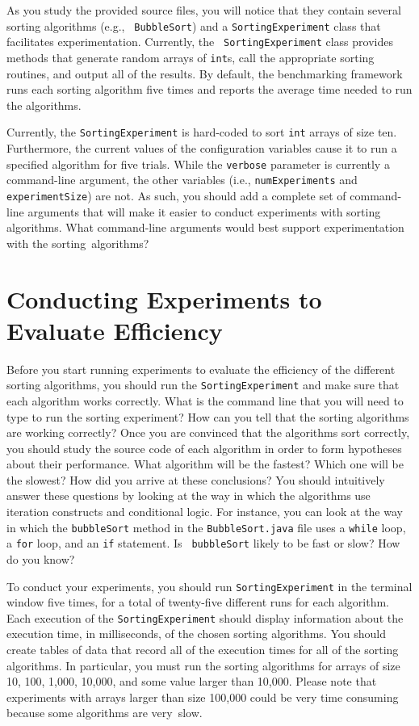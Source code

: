 As you study the provided source files, you will notice that they contain several sorting algorithms (e.g., {\tt
  BubbleSort}) and a {\tt SortingExperiment} class that facilitates experimentation. Currently, the {\tt
  SortingExperiment} class provides methods that generate random arrays of {\tt int}s, call the appropriate sorting
routines, and output all of the results.  By default, the benchmarking framework runs each sorting algorithm five times
and reports the average time needed to run the algorithms.

Currently, the {\tt SortingExperiment} is hard-coded to sort {\tt int} arrays of size ten. Furthermore, the current
values of the configuration variables cause it to run a specified algorithm for five trials.  While the {\tt verbose}
parameter is currently a command-line argument, the other variables (i.e., {\tt numExperiments} and {\tt
  experimentSize}) are not.  As such, you should add a complete set of command-line arguments that will make it easier
to conduct experiments with sorting algorithms. What command-line arguments would best support experimentation with 
the \mbox{sorting algorithms}?

\section*{Conducting Experiments to Evaluate Efficiency}

Before you start running experiments to evaluate the efficiency of the different sorting algorithms, you should run the
{\tt SortingExperiment} and make sure that each algorithm works correctly.  What is the command line that you will need
to type to run the sorting experiment? How can you tell that the sorting algorithms are working correctly? Once you are
convinced that the algorithms sort correctly, you should study the source code of each algorithm in order to form 
hypotheses about their performance.  What algorithm will be the fastest? Which one will be the slowest? How did you
arrive at these conclusions? You should intuitively answer these questions by looking at the way in which the algorithms
use iteration constructs and conditional logic. For instance, you can look at the way in which the {\tt bubbleSort}
method in the {\tt BubbleSort.java} file uses a {\tt while} loop, a {\tt for} loop, and an {\tt if} statement. Is {\tt
  bubbleSort} likely to be fast or slow? How do you know?  

To conduct your experiments, you should run {\tt SortingExperiment} in the terminal window five times, for a total of
twenty-five different runs for each algorithm. Each execution of the {\tt SortingExperiment} should display information
about the execution time, in milliseconds, of the chosen sorting algorithms. You should create tables of data that
record all of the execution times for all of the sorting algorithms. In particular, you must run the sorting algorithms
for arrays of size 10, 100, 1,000, 10,000, and some value larger than 10,000. Please note that experiments 
with arrays larger than size 100,000 could be very time consuming because some algorithms are \mbox{very slow}.

